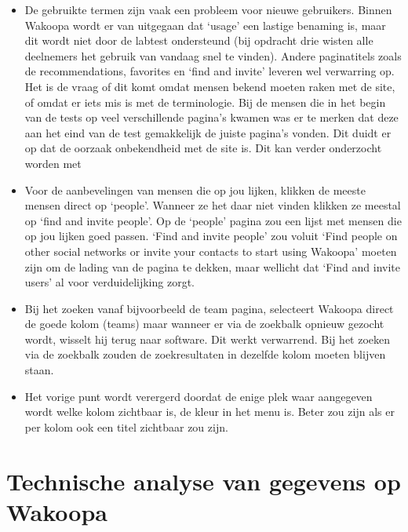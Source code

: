 \documentclass[a4paper, 10pt, pdftex]{report}
\begin{document}
      \begin{itemize}

        \item De gebruikte termen zijn vaak een probleem voor nieuwe gebruikers. Binnen Wakoopa wordt er van uitgegaan dat `usage' een lastige benaming is, maar dit wordt niet door de labtest ondersteund (bij opdracht drie wisten alle deelnemers het gebruik van vandaag snel te vinden). Andere paginatitels zoals de recommendations, favorites en `find and invite' leveren wel verwarring op. Het is de vraag of dit komt omdat mensen bekend moeten raken met de site, of omdat er iets mis is met de terminologie. Bij de mensen die in het begin van de tests op veel verschillende pagina's kwamen was er te merken dat deze aan het eind van de test gemakkelijk de juiste pagina's vonden. Dit duidt er op dat de oorzaak onbekendheid met de site is. Dit kan verder onderzocht worden met

        \item Voor de aanbevelingen van mensen die op jou lijken, klikken de meeste mensen direct op `people'. Wanneer ze het daar niet vinden klikken ze meestal op `find and invite people'. Op de `people' pagina zou een lijst met mensen die op jou lijken goed passen. `Find and invite people' zou voluit `Find people on other social networks or invite your contacts to start using Wakoopa' moeten zijn om de lading van de pagina te dekken, maar wellicht dat `Find and invite users' al voor verduidelijking zorgt.

        \item Bij het zoeken vanaf bijvoorbeeld de team pagina, selecteert Wakoopa direct de goede kolom (teams) maar wanneer er via de zoekbalk opnieuw gezocht wordt, wisselt hij terug naar software. Dit werkt verwarrend. Bij het zoeken via de zoekbalk zouden de zoekresultaten in dezelfde kolom moeten blijven staan.

        \item Het vorige punt wordt verergerd doordat de enige plek waar aangegeven wordt welke kolom zichtbaar is, de kleur in het menu is. Beter zou zijn als er per kolom ook een titel zichtbaar zou zijn.

      \end{itemize}

  \newpage
  \chapter{Technische analyse van gegevens op Wakoopa}
    \label{datachapter}
    \newpage
\end{document}
